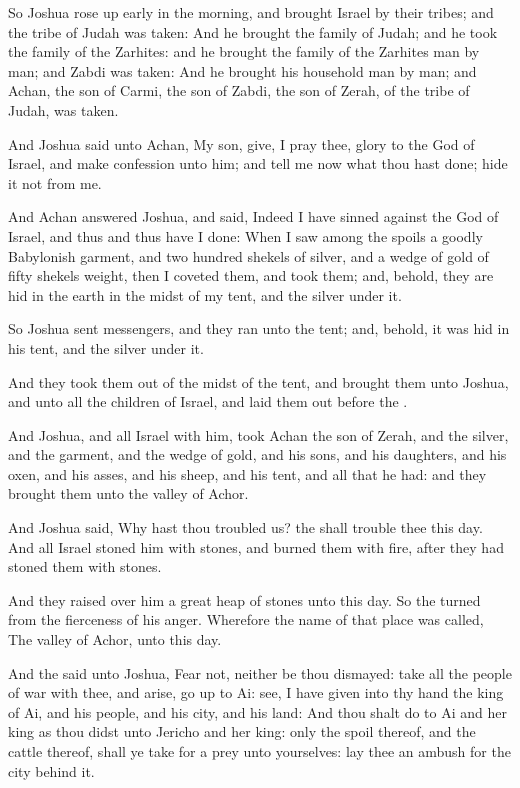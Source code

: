 \Verse So Joshua rose up early in the morning, and brought Israel by their tribes; and the tribe of Judah was taken: \Verse And he brought the family of Judah; and he took the family of the Zarhites: and he brought the family of the Zarhites man by man; and Zabdi was taken: \Verse And he brought his household man by man; and Achan, the son of Carmi, the son of Zabdi, the son of Zerah, of the tribe of Judah, was taken.

\Verse And Joshua said unto Achan, My son, give, I pray thee, glory to the \LORD God of Israel, and make confession unto him; and tell me now what thou hast done; hide it not from me.

\Verse And Achan answered Joshua, and said, Indeed I have sinned against the \LORD God of Israel, and thus and thus have I done: \Verse When I saw among the spoils a goodly Babylonish garment, and two hundred shekels of silver, and a wedge of gold of fifty shekels weight, then I coveted them, and took them; and, behold, they are hid in the earth in the midst of my tent, and the silver under it.

\Verse So Joshua sent messengers, and they ran unto the tent; and, behold, it was hid in his tent, and the silver under it.

\Verse And they took them out of the midst of the tent, and brought them unto Joshua, and unto all the children of Israel, and laid them out before the \LORD.

\Verse And Joshua, and all Israel with him, took Achan the son of Zerah, and the silver, and the garment, and the wedge of gold, and his sons, and his daughters, and his oxen, and his asses, and his sheep, and his tent, and all that he had: and they brought them unto the valley of Achor.

\Verse And Joshua said, Why hast thou troubled us? the \LORD shall trouble thee this day. And all Israel stoned him with stones, and burned them with fire, after they had stoned them with stones.

\Verse And they raised over him a great heap of stones unto this day. So the \LORD turned from the fierceness of his anger. Wherefore the name of that place was called, The valley of Achor, unto this day.


\Chapter
\Verse And the \LORD said unto Joshua, Fear not, neither be thou dismayed: take all the people of war with thee, and arise, go up to Ai: see, I have given into thy hand the king of Ai, and his people, and his city, and his land: \Verse And thou shalt do to Ai and her king as thou didst unto Jericho and her king: only the spoil thereof, and the cattle thereof, shall ye take for a prey unto yourselves: lay thee an ambush for the city behind it.

